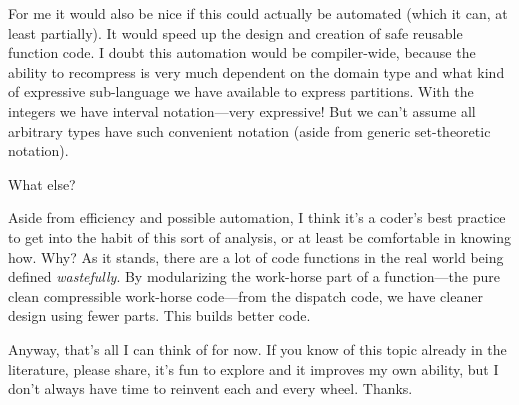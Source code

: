 \documentclass[twoside]{article}
\begin{document}
For me it would also be nice if this could actually be automated (which it can, at least partially).
It would speed up the design and creation of safe reusable function code. I doubt this automation would
be compiler-wide, because the ability to recompress is very much dependent on the domain type and what
kind of expressive sub-language we have available to express partitions. With the integers we have interval
notation---very expressive! But we can't assume all arbitrary types have such convenient notation
(aside from generic set-theoretic notation).

What else?

Aside from efficiency and possible automation, I think it's a coder's best practice to get into the habit
of this sort of analysis, or at least be comfortable in knowing how. Why? As it stands, there are a lot
of code functions in the real world being defined \emph{wastefully}. By modularizing the work-horse part
of a function---the pure clean compressible work-horse code---from the dispatch code, we have cleaner
design using fewer parts. This builds better code.

Anyway, that's all I can think of for now. If you know of this topic already in the literature, please share,
it's fun to explore and it improves my own ability, but I don't always have time to reinvent each and
every wheel. Thanks.
\end{document}
